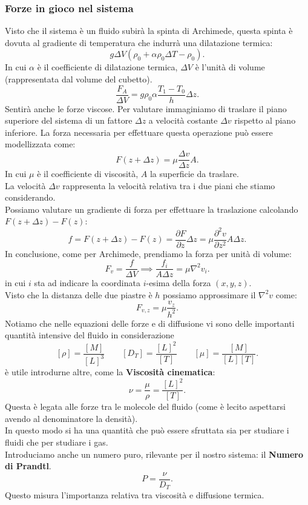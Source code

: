 \subsubsection{Forze in gioco nel sistema}%
\label{subsub:Forze in gioco nel sistema}
Visto che il sistema è un fluido subirà la spinta di Archimede, questa spinta è dovuta al gradiente di temperatura che indurrà una dilatazione termica:
\[
    g\Delta V(\rho_0 + \alpha\rho_0\Delta T- \rho_0)
.\] 
In cui $\alpha$ è il coefficiente di dilatazione termica, $\Delta V$ è l'unità di volume (rappresentata dal volume del cubetto).
\[
    \frac{F_A}{\Delta V} = g\rho_0\alpha\frac{T_1-T_0}{h}\Delta z
.\] 
Sentirà anche le forze viscose. Per valutare immaginiamo di traslare il piano superiore del sistema di un fattore $\Delta z$ a velocità costante $\Delta v$ rispetto al piano inferiore. La forza necessaria per effettuare questa operazione può essere modellizzata come:
\[
    F(z + \Delta z) = \mu  \frac{\Delta v}{\Delta z}A
.\] 
In cui $\mu$ è il coefficiente di viscosità, $A$ la superficie da traslare.\\
La velocità $\Delta v$ rappresenta la velocità relativa tra i due piani che stiamo considerando.\\
Possiamo valutare un gradiente di forza per effettuare la traslazione calcolando $F(z+\Delta z)-F(z)$:
\[
    f = F(z+\Delta z)-F(z)= \frac{\partial F}{\partial z} \Delta z = \mu\frac{\partial^2v}{\partial z^2} A\Delta z
.\] 
In conclusione, come per Archimede, prendiamo la forza per unità di volume:
\[
    F_v = \frac{f}{\Delta V} \implies \frac{f_i}{A\Delta z} = \mu\nabla ^2v_i
.\] 
in cui $i$ sta ad indicare la coordinata $i$-esima della forza $(x,y,z)$.\\
Visto che la distanza delle due piastre è $h$ possiamo approssimare il $\nabla ^2v$ come:
\[
    F_{v,z} = \mu \frac{v_z}{h^2}
.\] 
Notiamo che nelle equazioni delle forze e di diffusione vi sono delle importanti quantità intensive del fluido in considerazione
\[
    \left[\rho\right] = \frac{\left[M\right]}{\left[L\right]^3} \qquad
    \left[D_T\right] = \frac{\left[L\right]^2}{\left[T\right]}\qquad
    \left[\mu\right] = \frac{\left[M\right]}{\left[L\right]\left[T\right]}
.\] 
è utile introdurne altre, come la \textbf{Viscosità cinematica}:
\[
    \nu  = \frac{\mu}{\rho} = \frac{\left[L\right]^2}{\left[T\right]}
.\] 
Questa è legata alle forze tra le molecole del fluido (come è lecito aspettarsi avendo al denominatore la densità).\\
In questo modo si ha una quantità che può essere sfruttata sia per studiare i fluidi che per studiare i gas.\\
Introduciamo anche un numero puro, rilevante per il nostro sistema: il \textbf{Numero di Prandtl}.
\[
    P = \frac{\nu}{D_T}
.\] 
Questo misura l'importanza relativa tra viscosità e diffusione termica.\\
